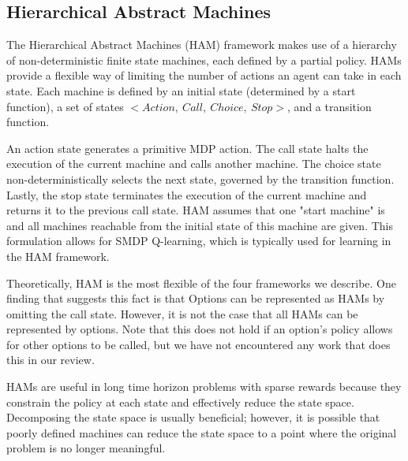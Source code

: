 \subsection{Hierarchical Abstract Machines}
The Hierarchical Abstract Machines (HAM) framework \cite{Parr} makes use of a hierarchy of
non-deterministic finite state machines, each defined by a partial policy.
HAMs provide a flexible way of limiting the number of actions an agent can take in each state.
Each machine is defined by an initial state (determined by a start function),
a set of states $<Action,\ Call,\ Choice,\ Stop>$, and a transition function.

An action state generates a primitive MDP action. The call state halts the
execution of the current machine and calls another
machine. The choice state non-deterministically selects the next state, governed by the transition function. Lastly, the
stop state terminates the execution of the current machine and returns it to the previous call state.
HAM assumes that one "start machine" is and all machines reachable from the initial state of this machine are given.
This formulation allows for SMDP Q-learning, which is typically used for learning in the HAM framework.

Theoretically, HAM is the most flexible of the four frameworks we describe.
One finding that suggests this fact is that Options can be represented
as HAMs by omitting the call state. However, it is not the case that all HAMs can be represented by
options. Note that this does not hold if an option's policy allows for other options to be called, but we
have not encountered any work that does this in our review.

HAMs are useful in long time horizon problems with sparse rewards because they
constrain the policy at each state and effectively reduce the state space.
Decomposing the state space is usually beneficial; however, it is possible that
poorly defined machines can reduce the state space to a point where the
original problem is no longer meaningful.
